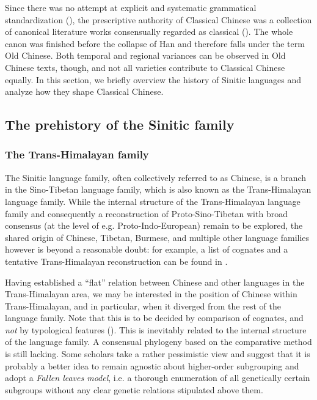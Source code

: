 \documentclass[UTF8, a4paper, oneside, scheme=plain, 12pt]{ctexrep}
\begin{document}
Since there was no attempt at explicit and systematic grammatical standardization
(),
the prescriptive authority of Classical Chinese was a collection of canonical literature works
consensually regarded as classical ().
The whole canon was finished before the collapse of Han
and therefore falls under the term Old Chinese.
Both temporal and regional variances can be observed in Old Chinese texts, though,
and not all varieties contribute to Classical Chinese equally.
In this section, we briefly overview the history of Sinitic languages
and analyze how they shape Classical Chinese.

\subsection{The prehistory of the Sinitic family}

\subsubsection{The Trans-Himalayan family}

The Sinitic language family, often collectively referred to as Chinese,
is a branch in the Sino-Tibetan language family, which is also known as the Trans-Himalayan language family.
While the internal structure of the Trans-Himalayan language family
and consequently a reconstruction of Proto-Sino-Tibetan with broad consensus
(at the level of e.g. Proto-Indo-European) remain to be explored,
the shared origin of Chinese, Tibetan, Burmese, and multiple other language families
however is beyond a reasonable doubt:
for example, a list of cognates and a tentative Trans-Himalayan reconstruction can be found in \citet{hill2019historical}.

Having established a ``flat'' relation between Chinese and other languages in the Trans-Himalayan area, 
we may be interested in the position of Chinese within Trans-Himalayan,
and in particular, when it diverged from the rest of the language family.
Note that this is to be decided by comparison of cognates,
and \emph{not} by typological features ().
This is inevitably related to the internal structure of the language family.
A consensual phylogeny based on the comparative method is still lacking.
Some scholars take a rather pessimistic view and suggest that
it is probably a better idea to remain agnostic about higher-order subgrouping
and adopt a \emph{Fallen leaves model}, i.e. a thorough enumeration of all genetically certain subgroups without any clear genetic relations stipulated above them.
\end{document}
